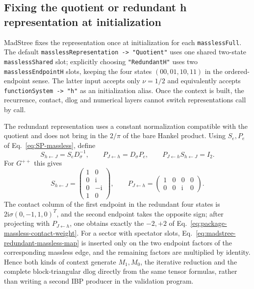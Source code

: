 \documentclass[11pt,a4paper]{article}
\newcommand{\ii}{\mathrm i}
\begin{document}
\subsection{Fixing the quotient or redundant h representation at initialization}

MadStree fixes the representation once at initialization for each \texttt{masslessFull}. The default \texttt{masslessRepresentation -> "Quotient"} uses one shared two-state \texttt{masslessShared} slot; explicitly choosing \texttt{"RedundantH"} uses two \texttt{masslessEndpointH} slots, keeping the four states $(00,01,10,11)$ in the ordered-endpoint sense. The latter input accepts only $\nu=1/2$ and equivalently accepts \texttt{functionSystem -> "h"} as an initialization alias. Once the context is built, the recurrence, contact, dlog and numerical layers cannot switch representations call by call.

The redundant representation uses a constant normalization compatible with the quotient and does not bring in the $2/\pi$ of the bare Hankel product. Using $S_e,P_e$ of Eq.~\eqref{eq:SP-massless}, define
\begin{equation}
 S_{h\leftarrow J}=S_eD_{\sigma}^{-1},\qquad
 P_{J\leftarrow h}=D_{\sigma}P_e,\qquad
 P_{J\leftarrow h}S_{h\leftarrow J}=I_2.
 \label{eq:madstree-redundant-massless-map}
\end{equation}
For $G^{++}$ this gives
\begin{equation}
 S_{h\leftarrow J}=\begin{pmatrix}1&0\\0&\ii\\0&-\ii\\1&0\end{pmatrix},
 \qquad
 P_{J\leftarrow h}=\begin{pmatrix}1&0&0&0\\0&0&\ii&0\end{pmatrix}.
\end{equation}
The contact column of the first endpoint in the redundant four states is
$2\ii\sigma(0,-1,1,0)^T$, and the second endpoint takes the opposite sign; after projecting with
$P_{J\leftarrow h}$, one obtains exactly the $-2,+2$ of Eq.~\eqref{eq:package-massless-contact-weight}.
For a sector with spectator slots, Eq.~\eqref{eq:madstree-redundant-massless-map} is inserted only on the two endpoint factors of the corresponding massless edge, and the remaining factors are multiplied by identity. Hence both kinds of context generate $M_1,M_0$, the iterative reduction and the complete block-triangular dlog directly from the same tensor formulas, rather than writing a second IBP producer in the validation program.
\end{document}
